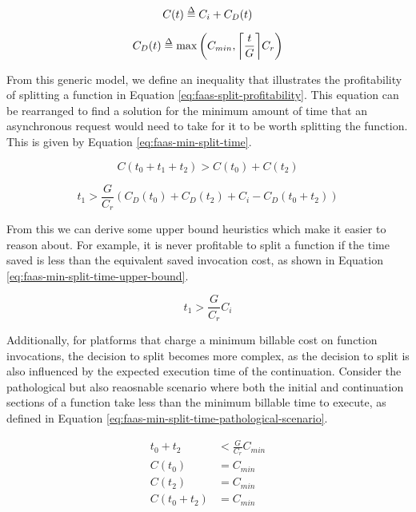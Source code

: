 \begin{equation} \label{eq:faas-billing-model}
C(t) \delequal C_i + C_D(t)
\end{equation}

\begin{equation}
C_D(t) \delequal \max\left(C_{min},\ceil*{\frac{t}{G}} C_r\right)
\end{equation}

From this generic model, we define an inequality that illustrates the profitability of splitting a function in Equation \ref{eq:faas-split-profitability}. This equation can be rearranged to find a solution for the minimum amount of time that an asynchronous request would need to take for it to be worth splitting the function. This is given by Equation \ref{eq:faas-min-split-time}.

\begin{equation} \label{eq:faas-split-profitability}
C(t_0 + t_1 + t_2) > C(t_0) + C(t_2)
\end{equation}

\begin{equation} \label{eq:faas-min-split-time}
t_1 > \frac{G}{C_r} \left( C_D(t_0) + C_D(t_2) + C_i - C_D(t_0 + t_2) \right)
\end{equation}

From this we can derive some upper bound heuristics which make it easier to reason about. For example, it is never profitable to split a function if the time saved is less than the equivalent saved invocation cost, as shown in Equation \ref{eq:faas-min-split-time-upper-bound}.

\begin{equation} \label{eq:faas-min-split-time-upper-bound}
t_1 > \frac{G}{C_r} C_i
\end{equation}

Additionally, for platforms that charge a minimum billable cost on function invocations, the decision to split becomes more complex, as the decision to split is also influenced by the expected execution time of the continuation. Consider the pathological but also reaosnable scenario where both the initial and continuation sections of a function take less than the minimum billable time to execute, as defined in Equation \ref{eq:faas-min-split-time-pathological-scenario}.

\begin{equation} \label{eq:faas-min-split-time-pathological-scenario}
\begin{aligned}
t_0 + t_2 & < \frac{G}{C_r} C_{min} \\
C(t_0) & = C_{min} \\
C(t_2) & = C_{min} \\
C(t_0 + t_2) & = C_{min}
\end{aligned}
\end{equation}

